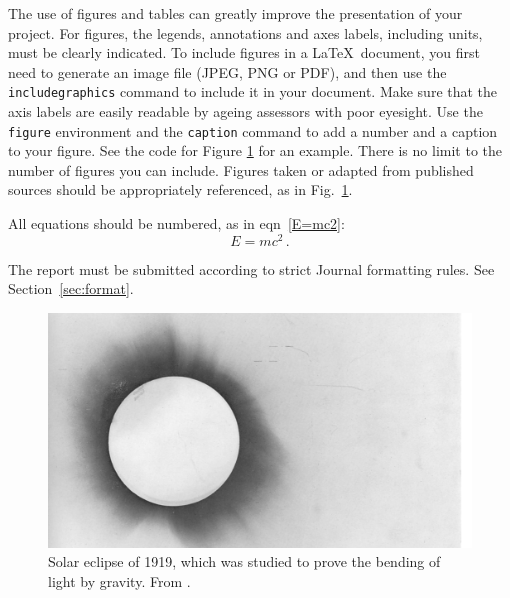 \documentclass[a4paper,fleqn,usenatbib]{mnras}
\begin{document}
 The use of figures and tables can greatly improve the presentation of your project. For figures, the legends, annotations and axes labels, including units, must be clearly indicated. To include figures in a \LaTeX\ document, you first need to generate an image file (JPEG, PNG or PDF), and then use the {\tt includegraphics} command to include it in your document. Make sure that the axis labels are easily readable by ageing assessors with poor eyesight. Use the {\tt figure} environment and the {\tt caption} command to add a number and a caption to your figure. See the code for Figure \ref{fig:eclipse} for an example. There is no limit to the number of figures you can include. 
Figures taken or adapted from published sources should be appropriately referenced, as in Fig.~\ref{fig:eclipse}.

All equations should be numbered, as in eqn~\ref{E=mc2}:
\begin{equation}
\label{E=mc2}
E = mc^2 \, .
\end{equation}



The report must be submitted according to strict Journal formatting rules. See Section~\ref{sec:format}.

\begin{figure}
\includegraphics[width=\columnwidth]{Dyson.jpeg}
\caption{\label{fig:eclipse}Solar eclipse of 1919, which was studied to prove the bending of light by gravity. From \protect\citet{Dyson}.}
\end{figure}
\end{document}

